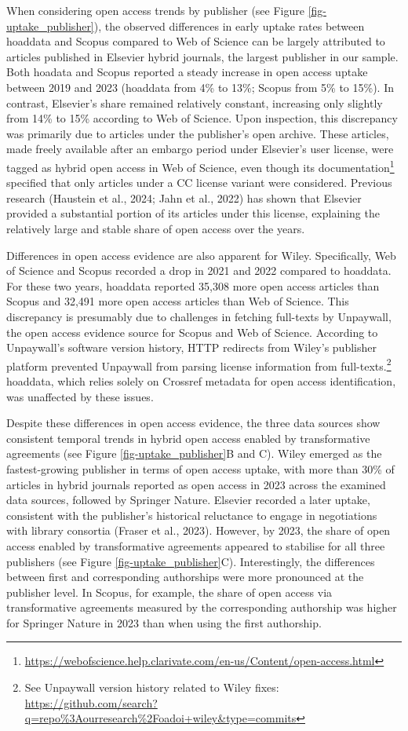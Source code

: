 \documentclass[a4paper,man,floatsintext,longtable,noextraspace,10pt]{apa6}
\begin{document}
When considering open access trends by publisher (see Figure
\ref{fig-uptake_publisher}), the observed differences in early uptake
rates between hoaddata and Scopus compared to Web of Science can be
largely attributed to articles published in Elsevier hybrid journals,
the largest publisher in our sample. Both hoadata and Scopus reported a
steady increase in open access uptake between 2019 and 2023 (hoaddata
from 4\% to 13\%; Scopus from 5\% to 15\%). In contrast, Elsevier's
share remained relatively constant, increasing only slightly from 14\%
to 15\% according to Web of Science. Upon inspection, this discrepancy
was primarily due to articles under the publisher's open archive. These
articles, made freely available after an embargo period under Elsevier's
user license, were tagged as hybrid open access in Web of Science, even
though its documentation\footnote{\url{https://webofscience.help.clarivate.com/en-us/Content/open-access.html}}
specified that only articles under a CC license variant were considered.
Previous research (Haustein et al., 2024; Jahn et al., 2022) has shown
that Elsevier provided a substantial portion of its articles under this
license, explaining the relatively large and stable share of open access
over the years.

Differences in open access evidence are also apparent for Wiley.
Specifically, Web of Science and Scopus recorded a drop in 2021 and 2022
compared to hoaddata. For these two years, hoaddata reported 35,308 more
open access articles than Scopus and 32,491 more open access articles
than Web of Science. This discrepancy is presumably due to challenges in
fetching full-texts by Unpaywall, the open access evidence source for
Scopus and Web of Science. According to Unpaywall's software version
history, HTTP redirects from Wiley's publisher platform prevented
Unpaywall from parsing license information from full-texts.\footnote{See
  Unpaywall version history related to Wiley fixes:
  \url{https://github.com/search?q=repo\%3Aourresearch\%2Foadoi+wiley&type=commits}}
hoaddata, which relies solely on Crossref metadata for open access
identification, was unaffected by these issues.

Despite these differences in open access evidence, the three data
sources show consistent temporal trends in hybrid open access enabled by
transformative agreements (see Figure \ref{fig-uptake_publisher}B and
C). Wiley emerged as the fastest-growing publisher in terms of open
access uptake, with more than 30\% of articles in hybrid journals
reported as open access in 2023 across the examined data sources,
followed by Springer Nature. Elsevier recorded a later uptake,
consistent with the publisher's historical reluctance to engage in
negotiations with library consortia (Fraser et al., 2023). However, by
2023, the share of open access enabled by transformative agreements
appeared to stabilise for all three publishers (see Figure
\ref{fig-uptake_publisher}C). Interestingly, the differences between
first and corresponding authorships were more pronounced at the
publisher level. In Scopus, for example, the share of open access via
transformative agreements measured by the corresponding authorship was
higher for Springer Nature in 2023 than when using the first authorship.
\end{document}
